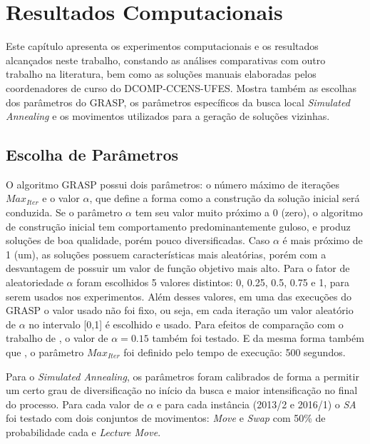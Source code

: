 \chapter{Resultados Computacionais}
\label{sec-resultados}

Este capítulo apresenta os experimentos computacionais e os resultados alcançados neste trabalho, constando as análises comparativas com outro trabalho na literatura, bem como as soluções manuais elaboradas pelos coordenadores de curso do DCOMP-CCENS-UFES. Mostra também as escolhas dos parâmetros do GRASP, os parâmetros específicos da busca local \textit{Simulated Annealing} e os movimentos utilizados para a geração de soluções vizinhas.

\section{Escolha de Parâmetros}
\label{sec-res-param}

O algoritmo GRASP possui dois parâmetros: o número máximo de iterações \(Max_{Iter}\) e o valor \(\alpha\), que define a forma como a construção da solução inicial será conduzida. Se o parâmetro \(\alpha\) tem seu valor muito próximo a 0 (zero), o algoritmo de construção inicial tem comportamento predominantemente guloso, e produz soluções de boa qualidade, porém pouco diversificadas. Caso \(\alpha\) é mais próximo de 1 (um), as soluções possuem características mais aleatórias, porém com a desvantagem de possuir um valor de função objetivo mais alto. Para o fator de aleatoriedade \(\alpha\) foram escolhidos 5 valores distintos: 0, 0.25, 0.5, 0.75 e 1, para serem usados nos experimentos. Além desses valores, em uma das execuções do GRASP o valor usado não foi fixo, ou seja, em cada iteração um valor aleatório de \(\alpha\) no intervalo [0,1] é escolhido e usado. Para efeitos de comparação com o trabalho de , o valor de  \(\alpha = 0.15\) também foi testado. E da mesma forma também que , o parâmetro \(Max_{Iter}\) foi definido pelo tempo de execução: 500 segundos. 

Para o \textit{Simulated Annealing}, os parâmetros foram calibrados de forma a permitir um certo grau de diversificação no início da busca e maior intensificação no final do processo. Para cada valor de \(\alpha\) e para cada instância (2013/2 e 2016/1) o \textit{SA} foi testado com dois conjuntos de movimentos: \textit{Move} e \textit{Swap} com 50\% de probabilidade cada e \textit{Lecture Move}.

